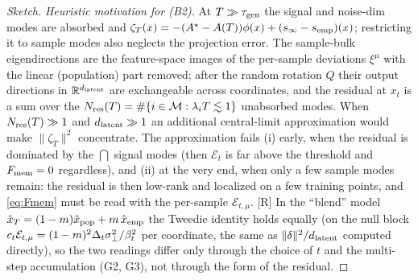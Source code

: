 \begin{proof}[Sketch]
\emph{Heuristic motivation for (B2).} At $T\gg\tau_{\mathrm{gen}}$ the signal and noise-dim modes are absorbed and $\zeta_T(x)=-(A^\star-A(T))\phi(x)+(s_\infty-s_{\rm emp})(x)$; restricting it to sample modes also neglects the projection error. The sample-bulk eigendirections are the feature-space images of the per-sample deviations $\xi^\mu$ with the linear (population) part removed; after the random rotation $Q$ their output directions in $\mathbb{R}^{d_{\mathrm{latent}}}$ are exchangeable across coordinates, and the residual at $x_t$ is a sum over the $N_{\rm res}(T)=\#\{i\in\mathcal M:\lambda_iT\lesssim1\}$ unabsorbed modes. When $N_{\rm res}(T)\gg1$ and $d_{\mathrm{latent}}\gg1$ an additional central-limit approximation would make $\|\zeta_T\|^2$ concentrate. The approximation fails (i) early, when the residual is dominated by the $\dint$ signal modes (then $\mathcal E_t$ is far above the threshold and $F_{\rm mem}=0$ regardless), and (ii) at the very end, when only a few sample modes remain: the residual is then low-rank and localized on a few training points, and \eqref{eq:Fmem} must be read with the per-sample $\mathcal E_{t,\mu}$. [R] In the ``blend'' model $\hat x_T=(1-m)\hat x_{\rm pop}+m\,\hat x_{\rm emp}$ the Tweedie identity holds equally (on the null block $c_t\mathcal E_{t,\mu}=(1-m)^2\Delta_t\sigma_{\perp}^2/\beta_t^2$ per coordinate, the same as $\|\delta\|^2/d_{\mathrm{latent}}$ computed directly), so the two readings differ only through the choice of $t$ and the multi-step accumulation (G2, G3), not through the form of the residual.
\end{proof}

